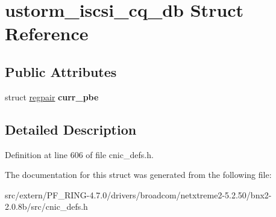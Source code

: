 \hypertarget{structustorm__iscsi__cq__db}{
\section{ustorm\_\-iscsi\_\-cq\_\-db Struct Reference}
\label{structustorm__iscsi__cq__db}
}
\subsection*{Public Attributes}
\begin{DoxyCompactItemize}
\item 
\hypertarget{structustorm__iscsi__cq__db_a3b4f11ec589c95c1d4ca706c31d6d47e}{
struct \hyperlink{structregpair}{regpair} {\bfseries curr\_\-pbe}}
\label{structustorm__iscsi__cq__db_a3b4f11ec589c95c1d4ca706c31d6d47e}

\end{DoxyCompactItemize}


\subsection{Detailed Description}


Definition at line 606 of file cnic\_\-defs.h.



The documentation for this struct was generated from the following file:\begin{DoxyCompactItemize}
\item 
src/extern/PF\_\-RING-\/4.7.0/drivers/broadcom/netxtreme2-\/5.2.50/bnx2-\/2.0.8b/src/cnic\_\-defs.h\end{DoxyCompactItemize}

